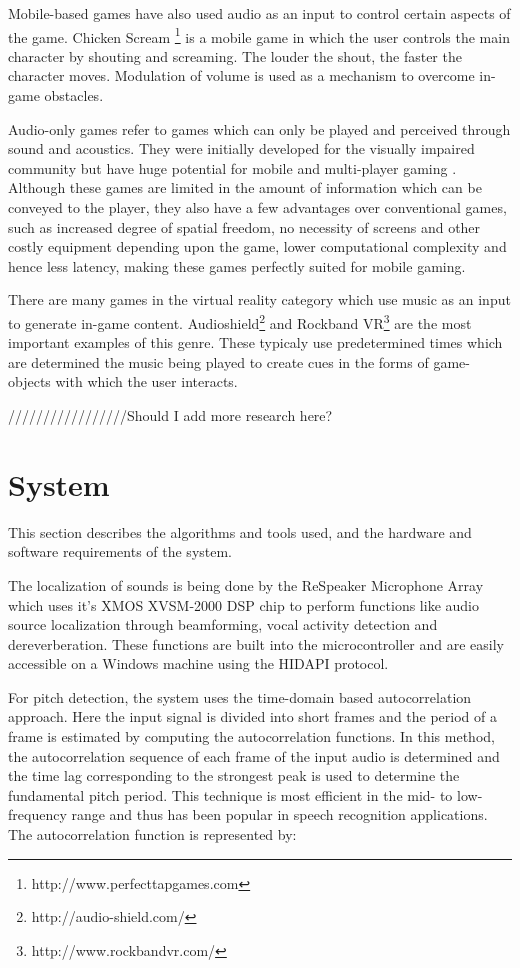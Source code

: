 \documentclass[convention]{aesconf}
\begin{document}
Mobile-based games have also used audio as an input to control certain aspects of the game. Chicken Scream \footnote{http://www.perfecttapgames.com} is a mobile game in which the user controls the main character by shouting and screaming. The louder the shout, the faster the character moves. Modulation of volume is used as a mechanism to overcome in-game obstacles.

Audio-only games refer to games which can only be played and perceived through sound and acoustics. They were initially developed for the visually impaired community but have huge potential for mobile and multi-player gaming \cite{rober2005playing}. Although these games are limited in the amount of information which can be conveyed to the player, they also have a few advantages over conventional games, such as increased degree of spatial freedom, no necessity of screens and other costly equipment depending upon the game, lower computational complexity and hence less latency, making these games perfectly suited for mobile gaming.

There are many games in the virtual reality category which use music as an input to generate in-game content. Audioshield\footnote{http://audio-shield.com/} and Rockband VR\footnote{http://www.rockbandvr.com/} are the most important examples of this genre. These typicaly use predetermined times which are determined the  music being played to create cues in the forms of game-objects with which the user interacts.

/////////////////Should I add more research here? \cite{Igarashi:2001:VSU:502348.502372}

\section{System}  
This section describes the algorithms and tools used, and the hardware and software requirements of the system.

The localization of sounds is being done by the ReSpeaker Microphone Array which uses it's XMOS XVSM-2000 DSP chip to perform functions like audio source localization through beamforming, vocal activity detection and dereverberation. These functions are built into the microcontroller and are easily accessible on a Windows machine using the HIDAPI protocol.

For pitch detection, the system uses the time-domain based autocorrelation approach. Here the input signal is divided into short frames and the period of a frame is estimated by computing the autocorrelation functions. In this method, the autocorrelation sequence of each frame of the input audio is determined and the time lag corresponding to the strongest peak is used to determine the fundamental pitch period. This technique is most efficient in the mid- to low-frequency range and thus has been popular in speech recognition applications. The autocorrelation function is represented by: 
\end{document}
